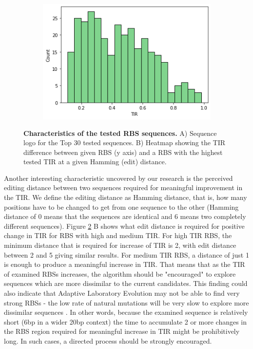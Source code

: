 \documentclass{article}
\begin{document}
\begin{figure}
\begin{subfigure}[b]{0.49\textwidth}
         \caption{}
     \end{subfigure}
     \hfill
     \begin{subfigure}[b]{0.49\textwidth}
         \centering
         \includegraphics[scale=0.5]{plots/Histogram.png}
         \caption{}
         \label{fig:five over x}
     \end{subfigure}
        \caption{\textbf{Characteristics of the tested RBS sequences.} A) Sequence logo for the Top 30 tested sequences. B) Heatmap showing the TIR difference between given RBS (y axis) and a RBS with the highest tested TIR at a given Hamming (edit) distance. }
        \label{fig:Library characteristics}
\end{figure}

Another interesting characteristic uncovered by our research is the perceived editing distance between two sequences required for meaningful improvement in the TIR. 
We define the editing distance as Hamming distance, that is, how many positions have to be changed to get from one sequence to the other (Hamming distance of 0 means that the sequences are identical and 6 means two completely different sequences).
Figure \ref{fig:Library characteristics} B shows what edit distance is required for positive change in TIR for RBS with high and medium TIR.
For high TIR RBS, the minimum distance that is required for increase of TIR is 2, with edit distance between 2 and 5 giving similar results.
For medium TIR RBS, a distance of just 1 is enough to produce a meaningful increase in TIR.
That means that as the TIR of examined RBSs increases, the algorithm should be "encouraged" to explore sequences which are more dissimilar to the current candidates.
This finding could also indicate that Adaptive Laboratory Evolution may not be able to find very strong RBSs - the low rate of natural mutations will be very slow to explore more dissimilar sequences \cite{Lee2012}.
In other words, because the examined sequence is relatively short (6bp in a wider 20bp context) the time to accumulate 2 or more changes in the RBS region required for meaningful increase in TIR might be prohibitively long.
In such cases, a directed process should be strongly encouraged.\\
\end{document}
